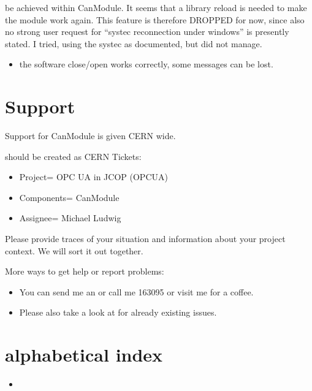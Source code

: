 \documentclass[letterpaper,10pt,english]{sphinxmanual}
\begin{document}
be achieved within CanModule. It seems that a library reload is needed to make the module work again.
This feature is therefore DROPPED for now, since also no strong user request for “systec reconnection
under windows” is presently stated. I tried, using the systec  as documented, but did not manage.
\begin{itemize}
\item {} 
the software close/open works correctly, some messages can be lost.

\end{itemize}


\chapter{Support}
\label{\detokenize{support:support}}\label{\detokenize{support::doc}}
Support for CanModule is given CERN wide.

 should be created as CERN  Tickets:
\begin{itemize}
\item {} 
Project= OPC UA in JCOP (OPCUA)

\item {} 
Components= CanModule

\item {} 
Assignee= Michael Ludwig

\end{itemize}

Please provide traces of your situation and information about your project context. We will sort it out together.

More  ways to get help or report problems:
\begin{itemize}
\item {} 
You can send me an  or call me 163095 or visit me for a coffee.

\item {} 
Please also take a look at  for already existing issues.

\end{itemize}


\chapter{alphabetical index}
\label{\detokenize{index:alphabetical-index}}\begin{itemize}
\item {} 

\end{itemize}



\renewcommand{\indexname}{Index}
\printindex
\end{document}
